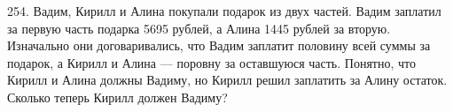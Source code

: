 254. Вадим, Кирилл и Алина покупали подарок из двух частей. Вадим заплатил за первую часть подарка 5695 рублей, а Алина 1445 рублей за вторую. Изначально они договаривались, что Вадим заплатит половину всей суммы за подарок, а Кирилл и Алина --- поровну за оставшуюся часть. Понятно, что Кирилл и Алина должны Вадиму, но Кирилл решил заплатить за Алину остаток. Сколько теперь Кирилл должен Вадиму?\\
